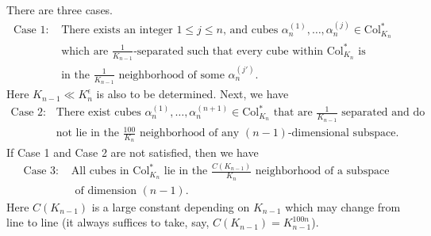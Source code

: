 \documentclass[12pt,leqno]{amsart}
\theoremstyle{plain}
\numberwithin{equation}{section}
\begin{document}
\noindent There are three cases. 
\[
\begin{split}
\text{Case 1: } & \text{There exists an integer $1\le j\le n$, and cubes $\alpha_n^{(1)}, \dots, \alpha_n^{(j)}\in \mathrm{Col}^*_{K_n}$ }\\
& \text{which are $\tfrac{1}{K_{n-1}}$-separated such that every cube within $\mathrm{Col}^*_{K_n}$ is }\\
& \text{in the $\tfrac{1}{K_{n-1}}$ neighborhood of some $\alpha^{(j')}_{n}$.}
\end{split}
\]
Here $K_{n-1}\ll K^{\epsilon}_n$  is also to be determined. Next, we have 
\[
\begin{split}
\text{Case 2: }& \text{There exist cubes $\alpha_n^{(1)}, \dots, \alpha_n^{(n+1)}\in \mathrm{Col}^*_{K_n}$ that are $\tfrac{1}{K_{n-1}}$ separated and do}\\
& \text{not lie in the $\tfrac{100}{K_n}$ neighborhood of any $(n-1)$-dimensional subspace.}
\end{split}
\]
If Case 1 and Case 2 are not satisfied, then we have 
\[
\begin{split}
\text{Case 3: } & \text{All cubes in $\mathrm{Col}^*_{K_n}$ lie in the $\tfrac{C(K_{n-1})}{K_n}$ neighborhood of a subspace}\\
&\text{ of dimension $(n-1)$.}
\end{split}
\]
Here $C(K_{n-1})$ is a large constant depending on $K_{n-1}$ which may change from line to line (it always suffices to take, say, $C(K_{n-1})=K_{n-1}^{100n}$).\\
\end{document}
